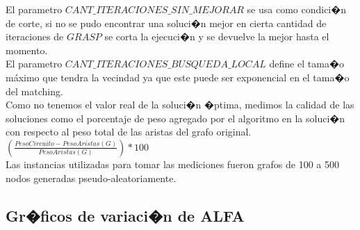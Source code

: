 \documentclass[11pt, a4paper, spanish]{article}
\begin{document}
\noindent El parametro $CANT\_ITERACIONES\_SIN\_MEJORAR$ se usa como condici�n de corte, si no se pudo encontrar una soluci�n mejor en cierta cantidad de iteraciones de $GRASP$ se corta la ejecuci�n y se devuelve la mejor hasta el momento.\\

\noindent El parametro $CANT\_ITERACIONES\_BUSQUEDA\_LOCAL$ define el tama�o m\'aximo que tendra la vecindad ya que este puede ser exponencial en el tama�o del matching.\\


Como no tenemos el valor real de la soluci�n �ptima, medimos la calidad de las soluciones como el porcentaje de peso agregado por el algoritmo en la soluci�n con respecto al peso total de las aristas del grafo original. $\left(\frac{PesoCircuito - PesoAristas(G)}{PesoAristas(G)}\right)*100$\\
Las instancias utilizadas para tomar las mediciones fueron grafos de 100 a 500 nodos generadas pseudo-aleatoriamente.\\

\newpage
\subsection{Gr�ficos de variaci�n de ALFA}
\end{document}
